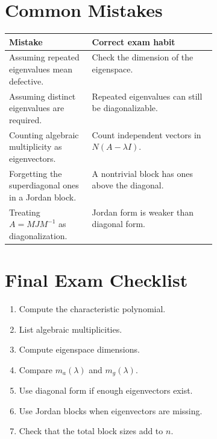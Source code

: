 \documentclass[10pt]{article}
\begin{document}
\section{Common Mistakes}

\begin{center}
\small
\begin{tabularx}{\linewidth}{@{}L{0.40\linewidth}Y@{}}
\toprule
Mistake & Correct exam habit \\
\midrule
Assuming repeated eigenvalues mean defective. & Check the dimension of the eigenspace. \\
Assuming distinct eigenvalues are required. & Repeated eigenvalues can still be diagonalizable. \\
Counting algebraic multiplicity as eigenvectors. & Count independent vectors in \(N(A-\lambda I)\). \\
Forgetting the superdiagonal ones in a Jordan block. & A nontrivial block has ones above the diagonal. \\
Treating \(A=MJM^{-1}\) as diagonalization. & Jordan form is weaker than diagonal form. \\
\bottomrule
\end{tabularx}
\end{center}

\section{Final Exam Checklist}

\begin{enumerate}
  \item Compute the characteristic polynomial.
  \item List algebraic multiplicities.
  \item Compute eigenspace dimensions.
  \item Compare \(m_a(\lambda)\) and \(m_g(\lambda)\).
  \item Use diagonal form if enough eigenvectors exist.
  \item Use Jordan blocks when eigenvectors are missing.
  \item Check that the total block sizes add to \(n\).
\end{enumerate}
\end{document}
